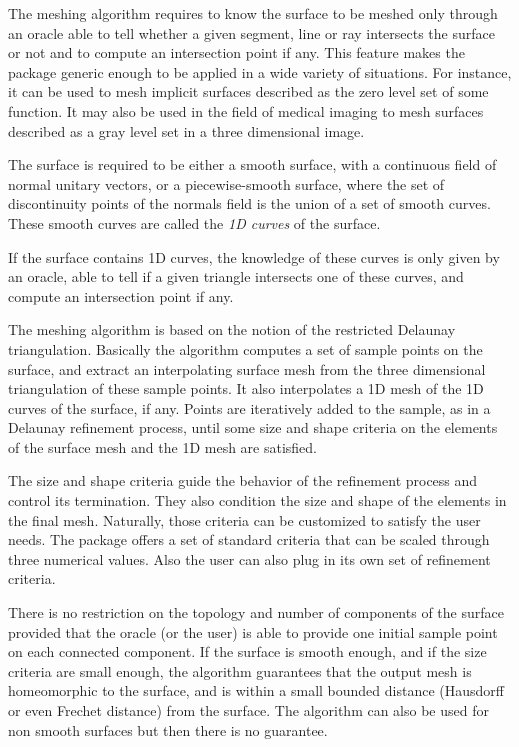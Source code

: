 The meshing algorithm requires to know the surface to be meshed
only  through an oracle able to  tell whether a
given segment, line or ray intersects the surface or not
and to compute an intersection point if any.
This feature makes the package generic enough to be
applied in a wide variety of situations. For instance, it can be
used to mesh implicit surfaces described as the zero level set
of some function. It may also be used in the field of medical imaging
to mesh surfaces described as a gray
level set in a three dimensional image.

The surface is required to be either a smooth surface, with a continuous
field of normal unitary vectors, or a piecewise-smooth surface, where the
set of discontinuity points of the normals field is the union of a set of
smooth curves. These smooth curves are called the \emph{1D curves} of the surface.

If the surface contains 1D curves, the knowledge of these curves is only
given by an oracle, able to tell if a given triangle intersects one of
these curves, and compute an intersection point if any.


The meshing algorithm is based on the notion of the restricted
Delaunay triangulation. Basically the algorithm  computes a set of
sample points on the surface, and extract an interpolating 
surface mesh  from the three dimensional triangulation of these 
sample points. It also interpolates a 1D mesh of the 1D curves of the
surface, if any. Points are iteratively added to the sample,
as in a Delaunay refinement process, until some size and shape
criteria on the elements of the surface mesh and the 1D mesh are
satisfied. 


The size and shape criteria guide the  behavior of
the refinement process and control its termination.
They also condition  the size and shape of the elements in the final
mesh. Naturally, those criteria can be customized to satisfy
the user needs. The  package offers
a set of standard criteria that can be scaled through
three numerical values. Also the user can also plug in its own 
set of refinement criteria.

There is no restriction on the topology and number of components
of the surface provided that the oracle (or the user)
is able to provide one initial sample point on each connected component.
If the surface is smooth enough, and if the size criteria are
small enough, the algorithm guarantees 
that the output mesh is homeomorphic to the
surface, and  is within a small bounded distance
(Hausdorff or even Frechet distance) from the surface.
The algorithm can also be used for non smooth surfaces
but then there is no guarantee. 




